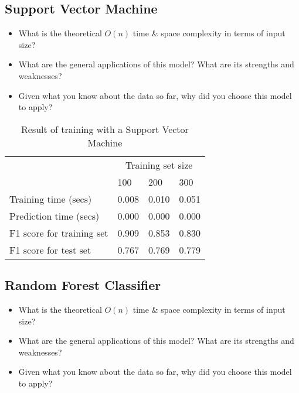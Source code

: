\documentclass[12pt]{article}
\begin{document}

\subsection*{Support Vector Machine}
\begin{itemize} [noitemsep,nolistsep]
\item What is the theoretical $O(n)$ time \& space complexity in terms of input size?
\item What are the general applications of this model? What are its strengths and weaknesses?
\item Given what you know about the data so far, why did you choose this model to apply?
\end{itemize} 


\setlength{\extrarowheight}{1.5pt}
\begin{table}[!htbp]
\caption{Result of training with a Support Vector Machine} %
\centering %
\begin{tabular}{|p{6cm}|p{1.5cm}|p{1.5cm}|p{1.5cm}|} %
\hline %
& \multicolumn{3}{c|}{Training set size}\\[5pt]
\cline{2-4} 
& 100 & 200 & 300\\[0.5ex]
\hline %

Training time (secs)   &       0.008 & 0.010 & 0.051 \\
Prediction time (secs)   &     0.000 & 0.000 & 0.000 \\
F1 score for training set  &   0.909 & 0.853 & 0.830 \\
F1 score for test set    &     0.767 & 0.769 & 0.779 \\
\hline %
\end{tabular}
\label{svmTable}
\end{table}


\subsection*{Random Forest Classifier}
\begin{itemize} [noitemsep,nolistsep]
\item What is the theoretical $O(n)$ time \& space complexity in terms of input size?
\item What are the general applications of this model? What are its strengths and weaknesses?
\item Given what you know about the data so far, why did you choose this model to apply?
\end{itemize} 
\end{document}
